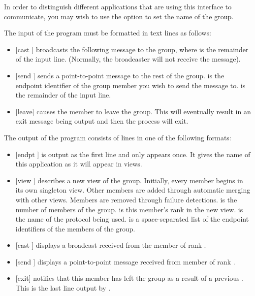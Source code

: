 In order to distinguish different applications that are using this interface to
communicate, you may wish to use the  option to set the
name of the group.

The input of the program must be formatted in text lines as follows:
\begin{itemize}
\item
{[cast ]} broadcasts the following message to the group, where
 is the remainder of the input line.  (Normally, the broadcaster
will not receive the message).
\item
{[send  ]} sends a point-to-point message to the rest of the
group.   is the endpoint identifier of the group member you wish to send
the message to.   is the remainder of the input line.
\item
{[leave]} causes the member to leave the group.  This will eventually result in
an exit message being output and then the  process will exit.
\end{itemize}

The output of the program consists of lines in one of the following formats:
\begin{itemize}
\item
{[endpt ]} is output as the first line and only appears once.  It
gives the name of this application as it will appear in views.
\item
{[view   ]} describes a new view of the
group.  Initially, every member begins in its own singleton view.  Other members are
added through automatic merging with other views.  Members are removed through
failure detections.   is the number of members of the group.
 is this member's rank in the new view.   is the name
of the protocol being used.   is a space-separated list of the endpoint
identifiers of the members of the group.
\item 
{[cast  ]} displays a broadcast received from the member of
rank .
\item
{[send  ]} displays a point-to-point message received
from member of rank .
\item
{[exit]} notifies that this member has left the group as a result of a previous
.  This is the last line output by .
\end{itemize}

